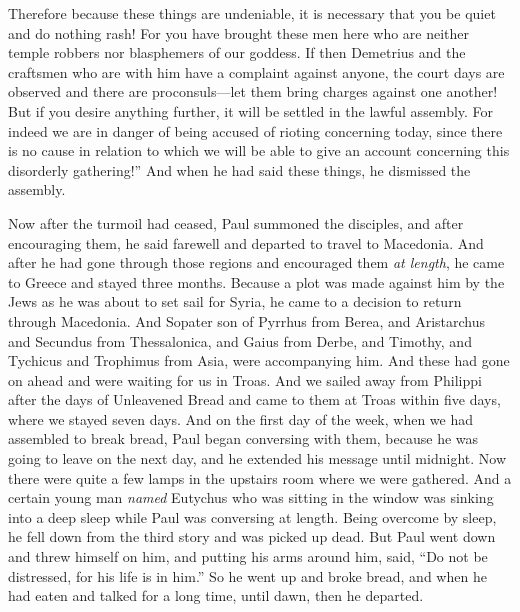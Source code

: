 \begin{biblechapter}
\verse Therefore because these things are undeniable, it is necessary that you be quiet and do nothing rash!
\verse For you have brought these men here who are neither temple robbers nor blasphemers of our goddess.
\verse If then Demetrius and the craftsmen who are with him have a complaint against anyone, the court days are observed and there are proconsuls—let them bring charges against one another!
\verse But if you desire anything further, it will be settled in the lawful assembly.
\verse For indeed we are in danger of being accused of rioting concerning today, since there is no cause in relation to which we will be able to give an account concerning this disorderly gathering!” And when he had said these things, he dismissed the assembly.
\end{biblechapter}

\begin{biblechapter} %
 Now after the turmoil had ceased, Paul summoned the disciples, and after encouraging them, he said farewell and departed to travel to Macedonia.
\verse And after he had gone through those regions and encouraged them \textit{at length}, he came to Greece
\verse and stayed three months. Because a plot was made against him by the Jews as he was about to set sail for Syria, he came to a decision to return through Macedonia.
\verse And Sopater son of Pyrrhus from Berea, and Aristarchus and Secundus from Thessalonica, and Gaius from Derbe, and Timothy, and Tychicus and Trophimus from Asia, were accompanying him.
\verse And these had gone on ahead and were waiting for us in Troas.
\verse And we sailed away from Philippi after the days of Unleavened Bread and came to them at Troas within five days, where we stayed seven days.
 And on the first day of the week, when we had assembled to break bread, Paul began conversing with them, because he was going to leave on the next day, and he extended his message until midnight.
\verse Now there were quite a few lamps in the upstairs room where we were gathered.
\verse And a certain young man \textit{named} Eutychus who was sitting in the window was sinking into a deep sleep while Paul was conversing at length. Being overcome by sleep, he fell down from the third story and was picked up dead.
\verse But Paul went down and threw himself on him, and putting his arms around him, said, “Do not be distressed, for his life is in him.”
\verse So he went up and broke bread, and when he had eaten and talked for a long time, until dawn, then he departed.

\end{biblechapter}

